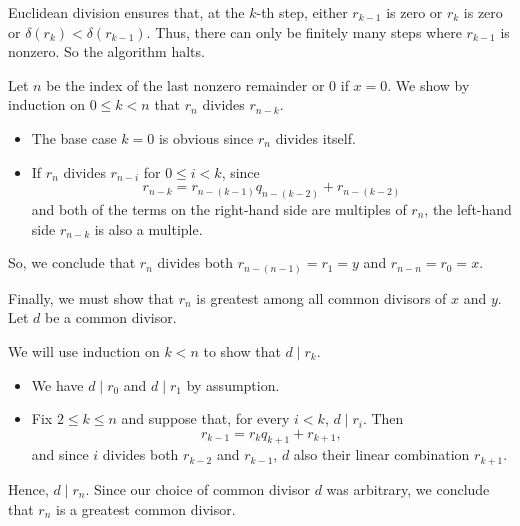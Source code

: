 \begin{defproof}
  Euclidean division ensures that, at the \( k \)-th step, either \( r_{k-1} \) is zero or \( r_k \) is zero or \( \delta(r_k) < \delta(r_{k-1}) \). Thus, there can only be finitely many steps where \( r_{k-1} \) is nonzero. So the algorithm halts.

  Let \( n \) be the index of the last nonzero remainder or \( 0 \) if \( x = 0 \). We show by induction on \( 0 \leq k < n \) that \( r_n \) divides \( r_{n-k} \).

  \begin{itemize}
    \item The base case \( k = 0 \) is obvious since \( r_n \) divides itself.
    \item If \( r_n \) divides \( r_{n-i} \) for \( 0 \leq i < k \), since
    \begin{equation*}
      r_{n-k} = r_{n-(k-1)} q_{n-(k-2)} + r_{n-(k-2)}
    \end{equation*}
    and both of the terms on the right-hand side are multiples of \( r_n \), the left-hand side \( r_{n-k} \) is also a multiple.
  \end{itemize}

  So, we conclude that \( r_n \) divides both \( r_{n-(n-1)} = r_1 = y \) and \( r_{n-n} = r_0 = x \).

  Finally, we must show that \( r_n \) is greatest among all common divisors of \( x \) and \( y \). Let \( d \) be a common divisor.

  We will use induction on \( k < n \) to show that \( d \mid r_k \).
  \begin{itemize}
    \item We have \( d \mid r_0 \) and \( d \mid r_1 \) by assumption.
    \item Fix \( 2 \leq k \leq n \) and suppose that, for every \( i < k \), \( d \mid r_i \). Then
    \begin{equation*}
      r_{k-1} = r_k q_{k+1} + r_{k+1},
    \end{equation*}
    and since \( i \) divides both \( r_{k-2} \) and \( r_{k-1} \), \( d \) also their linear combination \( r_{k+1} \).
  \end{itemize}

  Hence, \( d \mid r_n \). Since our choice of common divisor \( d \) was arbitrary, we conclude that \( r_n \) is a greatest common divisor.
\end{defproof}

